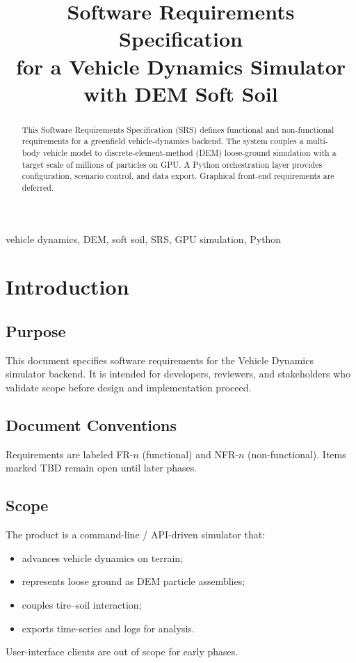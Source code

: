 \documentclass[conference]{IEEEtran}
\begin{document}
\title{Software Requirements Specification\\for a Vehicle Dynamics Simulator with DEM Soft Soil}

\author{
}

\maketitle

\begin{abstract}
This Software Requirements Specification (SRS) defines functional and non-functional
requirements for a greenfield vehicle-dynamics backend. The system couples a
multi-body vehicle model to discrete-element-method (DEM) loose-ground simulation
with a target scale of millions of particles on GPU. A Python orchestration layer
provides configuration, scenario control, and data export. Graphical front-end
requirements are deferred.
\end{abstract}

\begin{IEEEkeywords}
vehicle dynamics, DEM, soft soil, SRS, GPU simulation, Python
\end{IEEEkeywords}

\section{Introduction}

\subsection{Purpose}
This document specifies software requirements for the Vehicle Dynamics simulator
backend. It is intended for developers, reviewers, and stakeholders who validate
scope before design and implementation proceed.

\subsection{Document Conventions}
Requirements are labeled FR-$n$ (functional) and NFR-$n$ (non-functional). Items
marked TBD remain open until later phases.

\subsection{Scope}
The product is a command-line / API-driven simulator that:
\begin{itemize}
  \item advances vehicle dynamics on terrain;
  \item represents loose ground as DEM particle assemblies;
  \item couples tire--soil interaction;
  \item exports time-series and logs for analysis.
\end{itemize}
User-interface clients are out of scope for early phases.
\end{document}
